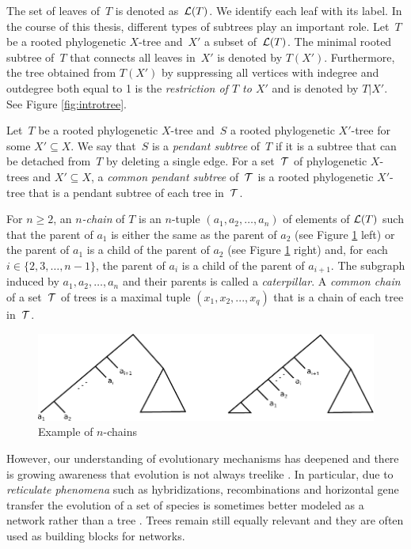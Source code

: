 The set of leaves of~$T$ is denoted as~${\mathcal L}(T)$. We identify each leaf with its label. In the course of this thesis, different types of subtrees play an important role. Let~$T$ be a rooted phylogenetic $X$-tree and~$X'$ a subset of~{${\mathcal L}(T)$}. The minimal rooted subtree of~$T$ that connects all leaves in~$X'$ is denoted by $T(X')$. Furthermore, the tree obtained from $T(X')$ by suppressing all {vertices with indegree and outdegree both equal to 1} is the {\it restriction of $T$ to $X'$} and is denoted by $T|X'$. See Figure \ref{fig:introtree}.

Let~$T$ be a rooted phylogenetic $X$-tree and~$S$ a rooted phylogenetic $X'$-tree for some $X' \subseteq X$. We say that~$S$ is a \emph{pendant subtree} of~$T$ if it is a subtree that can be detached from~$T$ by deleting a single edge. For a set~$\mathcal{T}$ of phylogenetic $X$-trees and $X' \subseteq X$, a \emph{common pendant subtree} of~$\mathcal{T}$ is a rooted phylogenetic $X'$-tree that is a pendant subtree of each tree in~$\mathcal{T}$. 

{
For $n\geq 2$, an {\it $n$-chain} of $T$ is an $n$-tuple $(a_1,a_2,\ldots,a_n)$ of elements of ${\mathcal L}(T)$ such that the parent of $a_1$ is either the same as the parent of $a_2$ (see Figure \ref{fig:chains_ex} left) or the parent of $a_1$ is a child of the parent of $a_2$ (see Figure \ref{fig:chains_ex} right) and, for each $i\in\{2,3,\ldots,n-1\}$, the parent of $a_i$ is a child of the parent of $a_{i+1}$. The subgraph induced by $a_1,a_2,\ldots,a_n$ and their parents is called a {\em caterpillar}.
A \emph{common chain} of a set~$\mathcal{T}$ of trees is a maximal tuple $(x_1, x_2,...,x_q)$ that is a chain of each tree in~$\mathcal{T}$.
}

\begin{figure}[h]
 \centering
 \includegraphics[width=0.9 \textwidth]{../figs/ch1/chains.pdf}
 \caption{Example of $n$-chains}
 \label{fig:chains_ex}
\end{figure}


However, our understanding of evolutionary mechanisms has deepened and there is growing awareness that evolution is not always treelike \cite{expanding}. In particular, due to \emph{reticulate phenomena} such as hybridizations, recombinations and horizontal gene transfer the evolution of a set of species is sometimes better modeled as a network rather than a tree \cite{davidbook}. Trees remain still equally relevant and they are often used as building blocks for networks.


